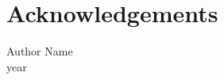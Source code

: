\cleardoublepage
\chapter*{Acknowledgements}


\begin{flushright}
Author Name\\
year
\end{flushright}